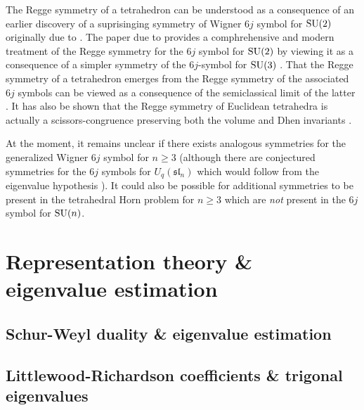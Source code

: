 \documentclass[notitlepage, 10pt]{article}
\begin{document}
\begin{rem}
    The Regge symmetry of a tetrahedron can be understood as a consequence of an earlier discovery of a suprisinging symmetry of Wigner $6j$ symbol for $\operatorname{SU}(2)$ originally due to \citeauthor{regge1959symmetry} \cite{regge1959symmetry}.
    The paper due to \citeauthor{boalch2007regge} provides a comphrehensive and modern treatment of the Regge symmetry for the $6j$ symbol for $\operatorname{SU}(2)$ by viewing it as a consequence of a simpler symmetry of the $6j$-symbol for $\operatorname{SU}(3)$ \cite{boalch2007regge}.
    That the Regge symmetry of a tetrahedron emerges from the Regge symmetry of the associated $6j$ symbols can be viewed as a consequence of the semiclassical limit of the latter \cite{ponzano1968semiclassical,roberts1999classical}.
    It has also be shown that the Regge symmetry of Euclidean tetrahedra is actually a scissors-congruence preserving both the volume and Dhen invariants \cite{akopyan2019regge}.

    At the moment, it remains unclear if there exists analogous symmetries for the generalized Wigner $6j$ symbol for $n \geq 3$ (although there are conjectured symmetries for the $6j$ symbols for $U_q(\mathfrak{sl}_n)$ which would follow from the eigenvalue hypothesis \cite{morozov2018new,lanina2023tug}).
    It could also be possible for additional symmetries to be present in the tetrahedral Horn problem for $n \geq 3$ which are \textit{not} present in the $6j$ symbol for $\operatorname{SU}(n)$.
\end{rem}

\clearpage
\section{Representation theory \& eigenvalue estimation}
\label{sec:rep_theory}

\subsection{Schur-Weyl duality \& eigenvalue estimation}


\subsection{Littlewood-Richardson coefficients \& trigonal eigenvalues}
\label{sec:lr_tri}
\end{document}
